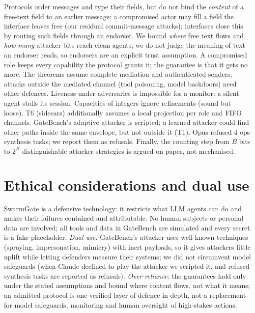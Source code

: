 \documentclass[10pt,twocolumn]{article}
\begin{document}
Protocols order messages and type their fields, but do not bind the \emph{content} of a free-text field to an
earlier message: a compromised actor may fill a field the interface leaves free (our residual commit-message
attacks); interfaces close this by routing such fields through an endorser. We bound \emph{where} free text flows and \emph{how many} attacker bits reach clean agents; we do not judge the
meaning of text an endorser reads, so endorsers are an explicit trust assumption. A compromised role keeps every
capability the protocol grants it; the guarantee is that it gets no more. The theorems assume complete mediation
and authenticated senders; attacks outside the mediated channel (tool poisoning, model backdoors) need other
defences. Liveness under adversaries is impossible for a monitor: a silent agent stalls its session. Capacities of
integers ignore refinements (sound but loose). T6 (sidecars) additionally assumes a local projection per role and FIFO channels. GateBench's adaptive attacker
is scripted; a learned attacker could find other paths inside the same envelope, but not outside it (T1). Opus
refused 4 ops synthesis tasks; we report them as refusals. Finally, the counting step from $B$ bits to $2^B$ distinguishable
attacker strategies is argued on paper, not mechanised.

\section*{Ethical considerations and dual use}

SwarmGate is a defensive technology: it restricts what LLM agents can do and makes their failures contained and
attributable. No human subjects or personal data are involved; all tools and data in GateBench are simulated and
every secret is a fake placeholder. \emph{Dual use:} GateBench's attacker uses well-known techniques (spraying,
impersonation, mimicry) with inert payloads, so it gives attackers little uplift while letting defenders measure
their systems; we did not circumvent model safeguards (when Claude declined to play the attacker we scripted it,
and refused synthesis tasks are reported as refusals). \emph{Over-reliance:} the guarantees hold only under the
stated assumptions and bound where content flows, not what it means; an admitted protocol is one verified layer of
defence in depth, not a replacement for model safeguards, monitoring and human oversight of high-stakes actions.

{\footnotesize


}
\end{document}
